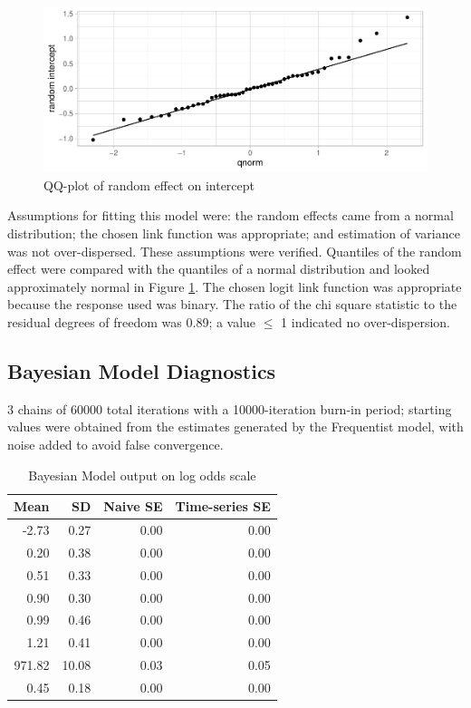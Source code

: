 \documentclass[12pt]{article}
\begin{document}
\label{sec:glmmd}

\begin{figure}[H]

{\centering \includegraphics{bookdown_report_files/figure-latex/qq-1} 

}

\caption{QQ-plot of random effect on intercept}\label{fig:qq}
\end{figure}

Assumptions for fitting this model were: the random effects came from a normal distribution; the chosen link function was appropriate; and estimation of variance was not over-dispersed. These assumptions were verified. Quantiles of the random effect were compared with the quantiles of a normal distribution and looked approximately normal in Figure \ref{fig:qq}. The chosen logit link function was appropriate because the response used was binary. The ratio of the chi square statistic to the residual degrees of freedom was 0.89; a value \(\le\) 1 indicated no over-dispersion.

\hypertarget{bayesian-model-diagnostics}{%
\subsection{Bayesian Model Diagnostics}\label{bayesian-model-diagnostics}}

\label{sec:bayesd}

3 chains of 60000 total iterations with a 10000-iteration burn-in period; starting values were obtained from the estimates generated by the Frequentist model, with noise added to avoid false convergence.

\begin{table}[!h]
\centering
\begin{tabular}{rrrr}
  \toprule
Mean & SD & Naive SE & Time-series SE \\ 
  \midrule
-2.73 & 0.27 & 0.00 & 0.00 \\ 
  0.20 & 0.38 & 0.00 & 0.00 \\ 
  0.51 & 0.33 & 0.00 & 0.00 \\ 
  0.90 & 0.30 & 0.00 & 0.00 \\ 
  0.99 & 0.46 & 0.00 & 0.00 \\ 
  1.21 & 0.41 & 0.00 & 0.00 \\ 
  971.82 & 10.08 & 0.03 & 0.05 \\ 
  0.45 & 0.18 & 0.00 & 0.00 \\ 
   \bottomrule
\end{tabular}
\caption{Bayesian Model output on log odds scale} 
\end{table}
\end{document}

